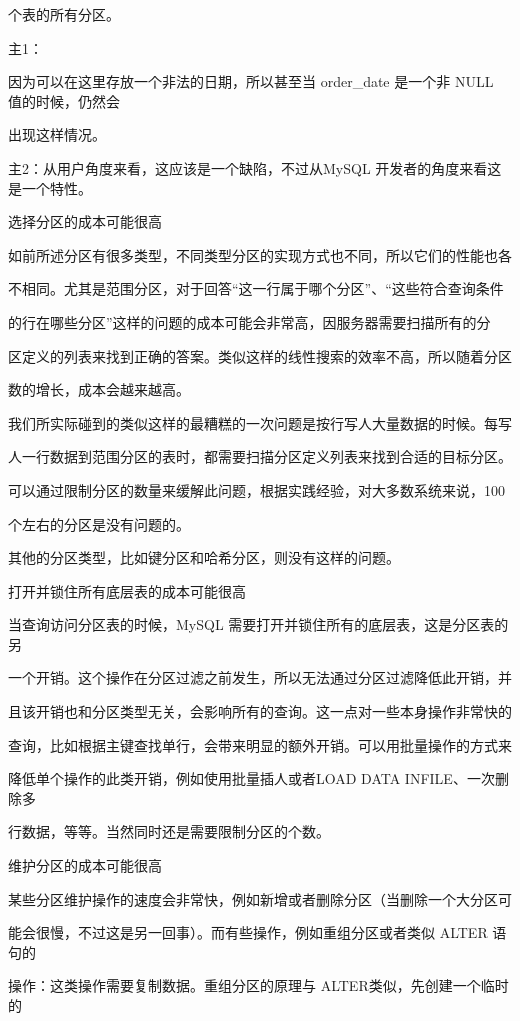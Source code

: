 个表的所有分区。

主1：

因为可以在这里存放一个非法的日期，所以甚至当 order\_date 是一个非 NULL 值的时候，仍然会

出现这样情况。

主2：从用户角度来看，这应该是一个缺陷，不过从MySQL 开发者的角度来看这是一个特性。

选择分区的成本可能很高

如前所述分区有很多类型，不同类型分区的实现方式也不同，所以它们的性能也各

不相同。尤其是范围分区，对于回答“这一行属于哪个分区”、“这些符合查询条件

的行在哪些分区”这样的问题的成本可能会非常高，因服务器需要扫描所有的分

区定义的列表来找到正确的答案。类似这样的线性搜索的效率不高，所以随着分区

数的增长，成本会越来越高。

我们所实际碰到的类似这样的最糟糕的一次问题是按行写人大量数据的时候。每写

人一行数据到范围分区的表时，都需要扫描分区定义列表来找到合适的目标分区。

可以通过限制分区的数量来缓解此问题，根据实践经验，对大多数系统来说，100

个左右的分区是没有问题的。

其他的分区类型，比如键分区和哈希分区，则没有这样的问题。

打开并锁住所有底层表的成本可能很高

当查询访问分区表的时候，MySQL 需要打开并锁住所有的底层表，这是分区表的另

一个开销。这个操作在分区过滤之前发生，所以无法通过分区过滤降低此开销，并

且该开销也和分区类型无关，会影响所有的查询。这一点对一些本身操作非常快的

查询，比如根据主键查找单行，会带来明显的额外开销。可以用批量操作的方式来

降低单个操作的此类开销，例如使用批量插人或者LOAD DATA INFILE、一次删除多

行数据，等等。当然同时还是需要限制分区的个数。

维护分区的成本可能很高

某些分区维护操作的速度会非常快，例如新增或者删除分区（当删除一个大分区可

能会很慢，不过这是另一回事）。而有些操作，例如重组分区或者类似 ALTER 语句的

操作：这类操作需要复制数据。重组分区的原理与 ALTER类似，先创建一个临时的

